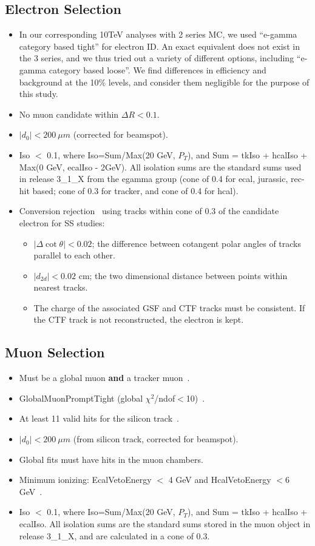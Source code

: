 \subsection{Electron Selection}
\label{sec:electron}

\begin{itemize}
\item In our corresponding 10TeV analyses with 2 series MC, we used ``e-gamma category based tight'' for electron ID.
      An exact equivalent does not exist in the 3 series, and we thus tried out a variety of different options, including ``e-gamma category based loose''.
      We find differences in efficiency and background at the 10\% levels, and consider them negligible for the purpose of this study.
\item No muon candidate within $\Delta R < 0.1$.
\item $|d_0| < 200~\mu m$ (corrected for beamspot).
\item Iso $<$ 0.1, where Iso=Sum/Max(20 GeV, $P_T$), and Sum = tkIso + hcalIso +  Max(0 GeV, ecalIso - 2GeV).
All isolation sums are the standard sums used in release 3\_1\_X from the egamma group (cone of
0.4 for ecal, jurassic, rec-hit based; cone of 0.3 for tracker, and cone of 0.4 for hcal).
\item Conversion rejection~\cite{conversionnote} using tracks within cone of 0.3 of the candidate electron for SS studies: 
\begin{itemize}
\item $|\Delta \cot\theta| < 0.02$; the difference between cotangent polar angles of tracks parallel to 
each other.
\item $|d_{2d}| < 0.02$ cm; the two dimensional distance between points within nearest tracks.
\item The charge of the associated GSF and CTF tracks must be consistent.
If the CTF track is not reconstructed, the electron is kept.
\end{itemize} 
\end{itemize}

\subsection{Muon Selection}
\label{sec:muon}
\begin{itemize}
\item Must be a global muon {\bf and} a tracker muon~\cite{glbtrk}.
\item GlobalMuonPromptTight (global $\chi^2$/ndof$<$10)~\cite{muonid}.
\item At least 11 valid hits for the silicon track~\cite{muonid}.
\item $|d_0| < 200~\mu m$ (from silicon track, corrected for beamspot).
\item Global fits must have hits in the muon chambers.
\item Minimum ionizing: EcalVetoEnergy $<$ 4 GeV and HcalVetoEnergy $<6$ GeV~\cite{vplusj}. 
\item Iso $<$ 0.1, where Iso=Sum/Max(20 GeV, $P_T$), and Sum = tkIso + hcalIso +  ecalIso.
All isolation sums are the standard sums stored in the muon object in release 3\_1\_X, and
are calculated in a cone of 0.3.
\end{itemize}

